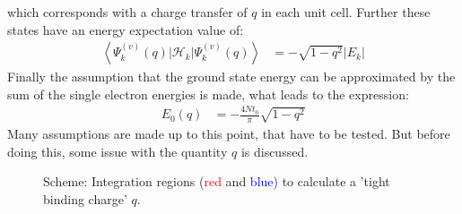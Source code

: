 which corresponds with a charge transfer of $q$ in each unit cell. Further these states have an energy expectation value of:
\begin{align}
\left\langle\Psi_k^{(v)}(q)\Big|\mathcal{H}_{k}\Big|\Psi_k^{(v)}(q)\right\rangle &= -\sqrt{1-q^2} |E_k|
\label{equation_method_1_energies}
\end{align}
Finally the assumption that the ground state energy can be approximated by the sum of the single electron energies is made, what leads to the expression:
\begin{align}
E_0(q) &= -\frac{4Nt_0}{\pi} \sqrt{1-q^2}
\label{equation_ground_state_energy_charge}
\end{align}
Many assumptions are made up to this point, that have to be tested. But before doing this, some issue with the quantity $q$ is discussed.\\
\begin{figure}
	\centering
	\caption{Scheme: Integration regions (\textcolor{red}{red} and \textcolor{blue}{blue}) to calculate a 'tight binding charge' $q$.}
	\label{image_tight_binding_q_regions}
\end{figure}
